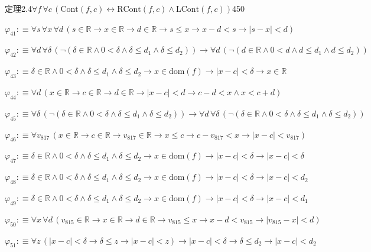 \begin{fullproof}{定理2.4}{$\forall f\,\forall c\,(\mathrm{Cont}(f,c) \leftrightarrow \mathrm{RCont}(f,c) \land \mathrm{LCont}(f,c))$}{450}
\begin{abbrevlist}
\item $\varphi_{41} :\equiv \forall s\,\forall x\,\forall d\,(s \in \mathbb{R} \to x \in \mathbb{R} \to d \in \mathbb{R} \to s \leq x \to x - d < s \to \lvert s - x \rvert < d)$
\item $\varphi_{42} :\equiv \forall d\,\forall \delta\,(\neg (\delta \in \mathbb{R} \land 0 < \delta \land \delta \leq d_{1} \land \delta \leq d_{2})) \to \forall d\,(\neg (d \in \mathbb{R} \land 0 < d \land d \leq d_{1} \land d \leq d_{2}))$
\item $\varphi_{43} :\equiv \delta \in \mathbb{R} \land 0 < \delta \land \delta \leq d_{1} \land \delta \leq d_{2} \to x \in \mathrm{dom}(f) \to \lvert x - c \rvert < \delta \to x \in \mathbb{R}$
\item $\varphi_{44} :\equiv \forall d\,(x \in \mathbb{R} \to c \in \mathbb{R} \to d \in \mathbb{R} \to \lvert x - c \rvert < d \to c - d < x \land x < c + d)$
\item $\varphi_{45} :\equiv \forall \delta\,(\neg (\delta \in \mathbb{R} \land 0 < \delta \land \delta \leq d_{1} \land \delta \leq d_{2})) \to \forall d\,\forall \delta\,(\neg (\delta \in \mathbb{R} \land 0 < \delta \land \delta \leq d_{1} \land \delta \leq d_{2}))$
\item $\varphi_{46} :\equiv \forall v_{817}\,(x \in \mathbb{R} \to c \in \mathbb{R} \to v_{817} \in \mathbb{R} \to x \leq c \to c - v_{817} < x \to \lvert x - c \rvert < v_{817})$
\item $\varphi_{47} :\equiv \delta \in \mathbb{R} \land 0 < \delta \land \delta \leq d_{1} \land \delta \leq d_{2} \to x \in \mathrm{dom}(f) \to \lvert x - c \rvert < \delta \to \lvert x - c \rvert < \delta$
\item $\varphi_{48} :\equiv \delta \in \mathbb{R} \land 0 < \delta \land \delta \leq d_{1} \land \delta \leq d_{2} \to x \in \mathrm{dom}(f) \to \lvert x - c \rvert < \delta \to \lvert x - c \rvert < d_{2}$
\item $\varphi_{49} :\equiv \delta \in \mathbb{R} \land 0 < \delta \land \delta \leq d_{1} \land \delta \leq d_{2} \to x \in \mathrm{dom}(f) \to \lvert x - c \rvert < \delta \to \lvert x - c \rvert < d_{1}$
\item $\varphi_{50} :\equiv \forall x\,\forall d\,(v_{815} \in \mathbb{R} \to x \in \mathbb{R} \to d \in \mathbb{R} \to v_{815} \leq x \to x - d < v_{815} \to \lvert v_{815} - x \rvert < d)$
\item $\varphi_{51} :\equiv \forall z\,(\lvert x - c \rvert < \delta \to \delta \leq z \to \lvert x - c \rvert < z) \to \lvert x - c \rvert < \delta \to \delta \leq d_{2} \to \lvert x - c \rvert < d_{2}$

\end{abbrevlist}
\end{fullproof}
